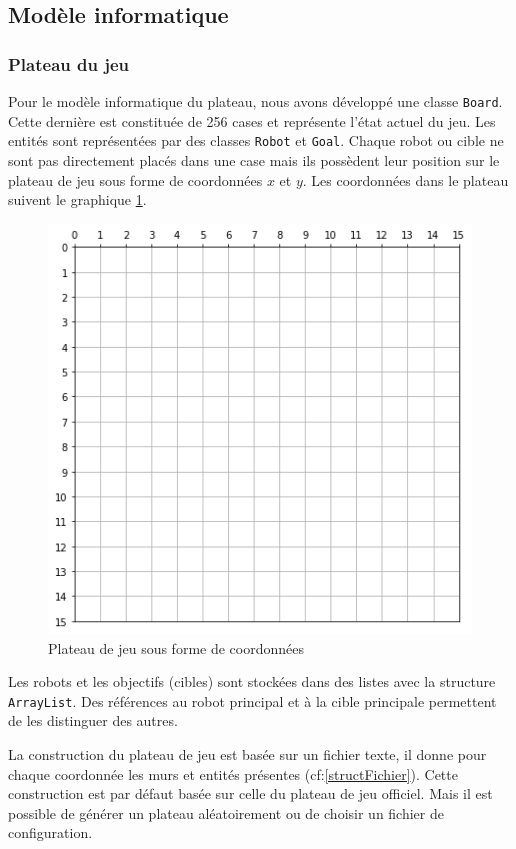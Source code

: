 \documentclass[a4paper]{article} %
\begin{document}
	\subsection{Modèle informatique}
		\subsubsection{Plateau du jeu}
Pour le modèle informatique du plateau, nous avons développé une classe \texttt{Board}. Cette dernière est constituée de 256 cases et représente l'état actuel du jeu. Les entités sont représentées par des classes \texttt{Robot} et \texttt{Goal}. Chaque robot ou cible ne sont pas directement placés dans une case mais ils possèdent leur position sur le plateau de jeu sous forme de coordonnées $x$ et $y$.
Les coordonnées dans le plateau suivent le graphique \ref{coordPlateau}.

\begin{figure}[!h]
	\begin{center}
	\includegraphics[scale=0.5]{./images/board.png}
	\caption{Plateau de jeu sous forme de coordonnées}\label{coordPlateau}
	\end{center}
\end{figure}

Les robots et les objectifs (cibles) sont stockées dans des listes avec la structure \texttt{ArrayList}. Des références au robot principal et à la cible principale permettent de les distinguer des autres.

La construction du plateau de jeu est basée sur un fichier texte, il donne pour chaque coordonnée les murs et entités présentes (cf:\ref{structFichier}). Cette construction est par défaut basée sur celle du plateau de jeu officiel. Mais il est possible de générer un plateau aléatoirement ou de choisir un fichier de configuration.
\end{document}
